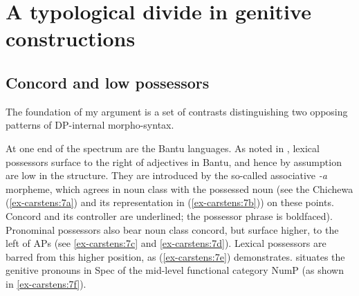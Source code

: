 \documentclass[output=paper
,modfonts
,nonflat]{langsci/langscibook}
\begin{document}
\section{A typological divide in genitive constructions} \label{sec-carstens:2}
\subsection{Concord and low possessors} \label{sec-carstens:2.1}
The foundation of my argument is a set of contrasts distinguishing two opposing patterns of DP-internal morpho-syntax.\largerpage

At one end of the spectrum are the Bantu languages. As noted in , lexical possessors surface to the right of adjectives in Bantu, and hence by assumption are low in the structure. They are introduced by the so-called associative \textit{-a} morpheme, which agrees in noun class with the possessed noun (see the Chichewa (\ref{ex-carstens:7a}) and its representation in (\ref{ex-carstens:7b})) on these points. Concord and its controller are underlined; the possessor phrase is boldfaced). Pronominal possessors also bear noun class concord, but surface higher, to the left of APs (see \ref{ex-carstens:7c} and \ref{ex-carstens:7d}). Lexical possessors are barred from this higher position, as (\ref{ex-carstens:7e}) demonstrates. \citet{Carstens1991, Carstens1997} situates the genitive pronouns in Spec of the mid-level functional category NumP (as shown in \ref{ex-carstens:7f}).
\end{document}
